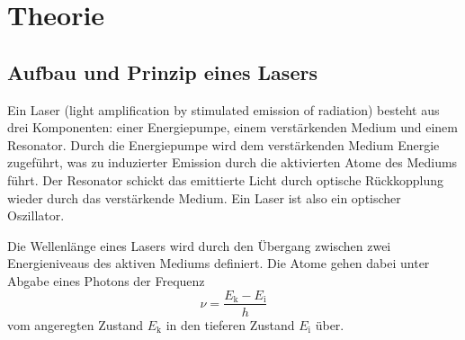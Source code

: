 
\section{Theorie}
\label{sec:Theorie}

\subsection{Aufbau und Prinzip eines Lasers}
Ein Laser (light amplification by stimulated emission of radiation) besteht aus drei Komponenten: einer Energiepumpe, einem verstärkenden Medium und einem Resonator.
Durch die Energiepumpe wird dem verstärkenden Medium Energie zugeführt, was zu induzierter Emission durch die aktivierten Atome des Mediums führt. Der Resonator schickt das emittierte Licht durch optische Rückkopplung wieder durch das verstärkende Medium. Ein Laser ist also ein optischer Oszillator.

Die Wellenlänge eines Lasers wird durch den Übergang zwischen zwei Energieniveaus des aktiven Mediums definiert. Die Atome gehen dabei unter Abgabe eines Photons
der Frequenz
\begin{equation*}
    \nu = \frac{E_\text{k} - E_\text{i}}{h}
\end{equation*}
vom angeregten Zustand $E_\text{k}$ in den tieferen Zustand $E_\text{i}$ über.



